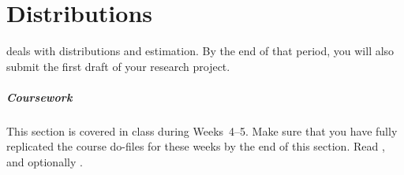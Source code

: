 %
%
\chapter{Distributions}%
	\label{ch:distr}%
  \begin{mybox}
     deals with distributions and estimation. By the end of that period, you will also submit the first draft of your research project.%
  
    \paragraph{Coursework} %
    This section is covered in class during Weeks~4--5. Make sure that you have fully replicated the course do-files for these weeks by the end of this section. Read  \citeauthor[ch.~4--7]{Urdan:2010a}, and optionally \citeauthor[ch.~2.5--2.6 and 5]{FeinsteinThomas:2002d}.%
  \end{mybox}\bigskip%
  \startcontents[chapters]%
	\newpage

%
%
%
%
%
%
% 
%


\stopcontents[chapters]
